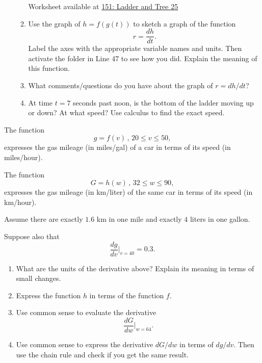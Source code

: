 \documentclass{ximera}
\begin{document}
\begin{question}
\begin{enumerate}
\begin{enumerate}
Worksheet available at \href{https://www.desmos.com/calculator/duq8yqxozk}{151: Ladder and Tree 25} 


\item Use the graph of $h=f(g(t))$ to sketch a graph of the function
\[
  r = \frac{dh}{dt} .
\]
Label the axes with the appropriate variable names and units. Then activate the folder in Line 47 to see how you did. Explain the meaning of this function.

\item What comments/questions do you have about the graph of $r=dh/dt$?

\item At time $t=7$ seconds past noon, is the bottom of the ladder moving up or down? At what speed? Use calculus to find the exact speed.


\end{enumerate}
\end{enumerate}
\end{question}

\begin{question}  \label{QPDFefrdffd}
The function
\[
        g = f(v) \, , \, 20\leq v \leq 50 ,
\]
expresses the gas mileage (in miles/gal) of a car in terms of its speed (in miles/hour).

The function 
\[
    G = h(w) \, , \, 32 \leq w \leq 90 ,
\] 
expresses the gas mileage (in km/liter) of the same car in terms of its speed (in km/hour).

Assume there are exactly $1.6$ km in one mile and exactly $4$ liters in one gallon.

Suppose also that 
\[
   \frac{dg}{dv}\Big|_{v=40} = 0.3 .
\]

\begin{enumerate}
\item What are the units of the derivative above? Explain its meaning in terms of small changes.

\item Express the function $h$ in terms of the function $f$.

\item Use common sense to evaluate the derivative
\[
          \frac{dG}{dw}\Big|_{w=64}.
\]

\item Use common sense to express the derivative $dG/dw$ in terms of $dg/dv$. Then use the chain rule and check if you get the same result. 
\end{enumerate}
\end{question}
\end{document}
